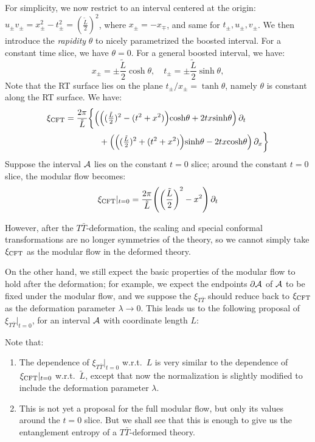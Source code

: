 \documentclass[11pt,a4paper]{article}
\newcommand{\TTbar}{\ensuremath{T\bar{T}}\xspace}
\begin{document}
	For simplicity, we now restrict to an interval centered at the origin: $
		u_\pm v_\pm
		= x^2_\pm - t^2_\pm
		= (\frac{{\tilde L}}{2})^2
	$, where $x_\pm = -x_\mp$, and same for $t_\pm, u_\pm, v_\pm$. 
	We then introduce the \textit{rapidity} $\theta$ to nicely parametrized the boosted interval. For a constant time slice, we have $\theta = 0$. For a general boosted interval, we have:
	\begin{equation}
		x_\pm = \pm \frac{{\tilde L}}{2} \cosh \theta,
	\quad
		t_\pm = \pm \frac{{\tilde L}}{2} \sinh \theta,
	\end{equation}
	Note that the RT surface lies on the plane $
		t_\pm / x_\pm = \tanh \theta
	$, namely $\theta$ is constant along the RT surface. 
	We have:
	\begin{gather}
	\begin{aligned}
		\xi_\mrm{CFT} &= \frac{2\pi}{{\tilde L}} \bigg\{
			\pqty\Big{
				\pqty{
					(\tfrac{{\tilde L}}{2})^2
					- (t^2 + x^2)
				} \cosh\theta
				+ 2tx \sinh\theta
			} \,\pdd{t}
		\\ &\qquad\qquad 
			+ \pqty\Big{
				\pqty{
					(\tfrac{{\tilde L}}{2})^2
					+ (t^2 + x^2)
				} \sinh\theta
				- 2tx \cosh\theta
			} \,\pdd{x}
		\bigg\}
	\end{aligned}
	\end{gather}
	Suppose the interval $\mathcal{A}$ lies on the constant $t = 0$ slice; around the constant $t = 0$ slice, the modular flow becomes:
	\begin{equation}
		\xi_\mrm{CFT}|_{t = 0} 
		= \frac{2\pi}{{\tilde L}}
			\pqty{
				\pqty{\frac{{\tilde L}}{2}}^2
				- x^2
			} \,\pdd{t}
	\end{equation}
	
	However, after the \TTbar-deformation, the scaling and special conformal transformations are no longer symmetries of the theory, so we cannot simply take $\xi_{\mathrm{CFT}}$ as the modular flow in the deformed theory. 
	
	On the other hand, we still expect the basic properties of the modular flow to hold after the deformation; for example, we expect the endpoints $\partial\mathcal{A}$ of $\mathcal{A}$ to be fixed under the modular flow, and we suppose the $\xi_{T\bar{T}}$ should reduce back to $\xi_{\mathrm{CFT}}$ as the deformation parameter $\lambda \to 0$. This leads us to the following proposal of $\xi_{T\bar{T}}|_{t = 0}$, for an interval $\mathcal{A}$ with coordinate length $L$:
	
	Note that:
	\begin{enumerate}[topsep=0pt]
	\item The dependence of $\xi_{T\bar{T}}|_{t = 0}$ w.r.t.~$L$ is very similar to the dependence of $\xi_{\mathrm{CFT}}|_{t = 0}$ w.r.t.~${\tilde L}$, except that now the normalization is slightly modified to include the deformation parameter $\lambda$. 
	\item This is not yet a proposal for the full modular flow, but only its values around the $t = 0$ slice. But we shall see that this is enough to give us the entanglement entropy of a \TTbar-deformed theory. 
	\end{enumerate}
\end{document}
